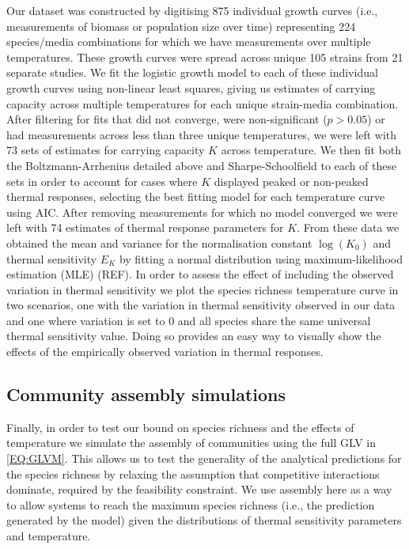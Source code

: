 \documentclass{article}
\begin{document}
Our dataset was constructed by digitising 875 individual growth curves (i.e., measurements of biomass or population size over time) representing 224 species/media combinations for which we have measurements over multiple temperatures. These growth curves were spread across unique 105 strains from 21 separate studies. We fit the logistic growth model to each of these individual growth curves using non-linear least squares, giving us estimates of carrying capacity across multiple temperatures for each unique strain-media combination. After filtering for fits that did not converge, were non-significant ($p > 0.05$) or had measurements across less than three unique temperatures, we were left with 73 sets of estimates for carrying capacity $K$ across temperature. We then fit both the Boltzmann-Arrhenius detailed above and Sharpe-Schoolfield \citep{Schoolfield1981} to each of these sets in order to account for cases where $K$ displayed peaked or non-peaked thermal responses, selecting the best fitting model for each temperature curve using AIC. After removing measurements for which no model converged we were left with 74 estimates of thermal response parameters for $K$. From these data we obtained the mean and variance for the normalisation constant $\log(K_0)$ and thermal sensitivity $E_K$ by fitting a normal distribution using maximum-likelihood estimation (MLE) (REF). In order to assess the effect of including the observed variation in thermal sensitivity we plot the species richness temperature curve in two scenarios, one with the variation in thermal sensitivity observed in our data and one where variation is set to $0$ and all species share the same universal thermal sensitivity value. Doing so provides an easy way to visually show the effects of the empirically observed variation in thermal responses.  

\subsection*{Community assembly simulations}

Finally, in order to test our bound on species richness and the effects of temperature we simulate the assembly of communities using the full GLV in \cref{EQ:GLVM}. This allows us to test the generality of the analytical predictions for the species richness by relaxing the assumption that competitive interactions dominate, required by the feasibility constraint. We use assembly here as a way to allow systems to reach the maximum species richness (i.e., the prediction generated by the model) given the distributions of thermal sensitivity parameters and temperature. 
\end{document}
